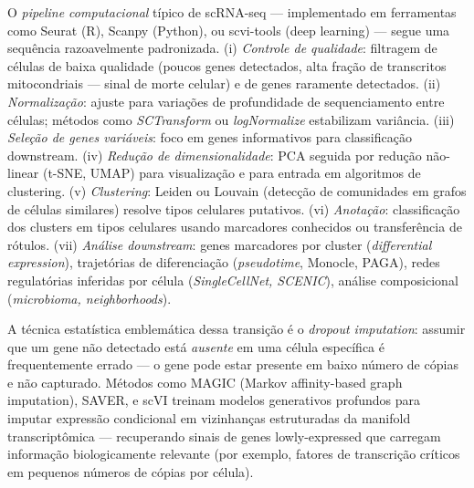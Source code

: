O \emph{pipeline computacional} típico de scRNA-seq --- implementado em ferramentas como Seurat (R), Scanpy (Python), ou scvi-tools (deep learning) --- segue uma sequência razoavelmente padronizada. (i) \emph{Controle de qualidade}: filtragem de células de baixa qualidade (poucos genes detectados, alta fração de transcritos mitocondriais --- sinal de morte celular) e de genes raramente detectados. (ii) \emph{Normalização}: ajuste para variações de profundidade de sequenciamento entre células; métodos como \emph{SCTransform} ou \emph{logNormalize} estabilizam variância. (iii) \emph{Seleção de genes variáveis}: foco em genes informativos para classificação downstream. (iv) \emph{Redução de dimensionalidade}: PCA seguida por redução não-linear (t-SNE, UMAP) para visualização e para entrada em algoritmos de clustering. (v) \emph{Clustering}: Leiden ou Louvain (detecção de comunidades em grafos de células similares) resolve tipos celulares putativos. (vi) \emph{Anotação}: classificação dos clusters em tipos celulares usando marcadores conhecidos ou transferência de rótulos. (vii) \emph{Análise downstream}: genes marcadores por cluster (\emph{differential expression}), trajetórias de diferenciação (\emph{pseudotime}, Monocle, PAGA), redes regulatórias inferidas por célula (\emph{SingleCellNet, SCENIC}), análise composicional (\emph{microbioma, neighborhoods}).

A técnica estatística emblemática dessa transição é o \emph{dropout imputation}: assumir que um gene não detectado está \emph{ausente} em uma célula específica é frequentemente errado --- o gene pode estar presente em baixo número de cópias e não capturado. Métodos como MAGIC (Markov affinity-based graph imputation), SAVER, e scVI treinam modelos generativos profundos para imputar expressão condicional em vizinhanças estruturadas da manifold transcriptômica --- recuperando sinais de genes lowly-expressed que carregam informação biologicamente relevante (por exemplo, fatores de transcrição críticos em pequenos números de cópias por célula).



\par

